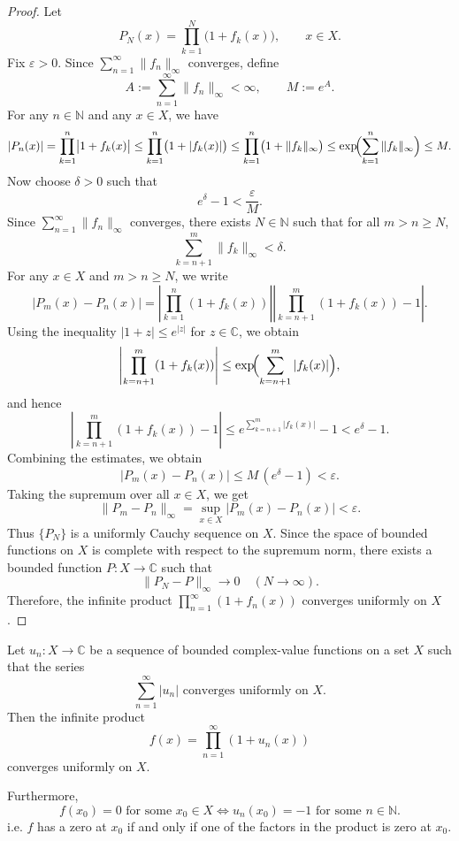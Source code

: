 \documentclass{elegantbook}
\begin{document}
\begin{proof}
  Let
  \[
    P_N(x)=\prod_{k=1}^{N}\bigl(1+f_k(x)\bigr), \qquad x\in X.
  \]
  Fix $\varepsilon>0$. Since $\sum_{n=1}^{\infty}\|f_n\|_{\infty}$ converges, define
  \[
    A:=\sum_{n=1}^{\infty}\|f_n\|_{\infty}<\infty, \qquad M:=e^{A}.
  \]
  For any $n\in\mathbb{N}$ and any $x\in X$, we have
  \[
    |P_n(x)| =\prod_{k=1}^{n}\bigl|1+f_k(x)\bigr| \le \prod_{k=1}^{n}\bigl(1+|f_k(x)|\bigr) \le \prod_{k=1}^{n}\bigl(1+\|f_k\|_{\infty}\bigr) \le \exp\!\Bigl(\sum_{k=1}^{n}\|f_k\|_{\infty}\Bigr) \le M.
  \]
  Now choose $\delta>0$ such that
  \[
    e^{\delta}-1<\frac{\varepsilon}{M}.
  \]
  Since $\sum_{n=1}^{\infty}\|f_n\|_{\infty}$ converges, there exists $N\in\mathbb{N}$ such that for all $m>n\ge N$,
  \[
    \sum_{k=n+1}^{m}\|f_k\|_{\infty}<\delta.
  \]
  For any $x\in X$ and $m>n\ge N$, we write
  \[
    |P_m(x)-P_n(x)| =\left|\prod_{k=1}^{n}(1+f_k(x))\right| \left|\prod_{k=n+1}^{m}(1+f_k(x))-1\right|.
  \]
  Using the inequality $|1+z|\le e^{|z|}$ for $z\in\mathbb{C}$, we obtain
  \[
    \left|\prod_{k=n+1}^{m}(1+f_k(x))\right| \le \exp\!\Bigl(\sum_{k=n+1}^{m}|f_k(x)|\Bigr),
  \]
  and hence
  \[
    \left|\prod_{k=n+1}^{m}(1+f_k(x))-1\right| \le e^{\sum_{k=n+1}^{m}|f_k(x)|}-1 < e^{\delta}-1.
  \]
  Combining the estimates, we obtain
  \[
    |P_m(x)-P_n(x)| \le M\,(e^{\delta}-1) <\varepsilon.
  \]
  Taking the supremum over all $x\in X$, we get
  \[
    \|P_m-P_n\|_{\infty} =\sup_{x\in X}|P_m(x)-P_n(x)| <\varepsilon.
  \]
  Thus $\{P_N\}$ is a uniformly Cauchy sequence on $X$.
  Since the space of bounded functions on $X$ is complete with respect to the supremum norm, there exists a bounded function $P:X\to\mathbb{C}$ such that
  \[
    \|P_N-P\|_{\infty}\to0\quad(N\to\infty).
  \]
  Therefore, the infinite product $\prod_{n=1}^{\infty}(1+f_n(x))$ converges uniformly on $X$.
\end{proof}

\begin{theorem} \label{thm:uniform_convergence_infinite_product}
  Let $u_n:X\to\mathbb{C}$ be a sequence of bounded complex-value functions on a set $X$ such that the series
  \[
    \sum_{n=1}^{\infty} |u_n| \text{ converges uniformly on } X.
  \]
  Then the infinite product
  \[
    f(x) = \prod_{n=1}^{\infty} (1 + u_n(x))
  \]
  converges uniformly on $X$.

  Furthermore,
  \[
    f(x_0) = 0 \text{ for some } x_0 \in X \iff u_n(x_0) = -1 \text{ for some } n \in \mathbb{N}.
  \]
  i.e. $f$ has a zero at $x_0$ if and only if one of the factors in the product is zero at $x_0$.
\end{theorem}
\end{document}

